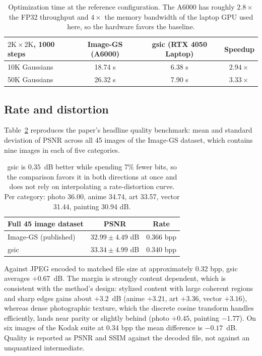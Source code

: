 \documentclass[11pt,a4paper]{article}
\begin{document}
\begin{table}[h]
\centering\small
\begin{tabular}{lccc}
\toprule
$2\mathrm{K}\times2\mathrm{K}$, 1000 steps & Image-GS (A6000) & gsic (RTX 4050 Laptop) & Speedup \\
\midrule
10K Gaussians & 18.74 s & 6.38 s & $2.94\times$ \\
50K Gaussians & 26.32 s & 7.90 s & $3.33\times$ \\
\bottomrule
\end{tabular}
\caption{Optimization time at the reference configuration. The A6000 has roughly $2.8\times$ the FP32 throughput and $4\times$ the memory bandwidth of the laptop GPU used here, so the hardware favors the baseline.}
\label{tab:speed}
\end{table}

\subsection{Rate and distortion}

Table~\ref{tab:quality} reproduces the paper's headline quality benchmark: mean and standard deviation of PSNR across all 45 images of the Image-GS dataset, which contains nine images in each of five categories.

\begin{table}[h]
\centering\small
\begin{tabular}{lcc}
\toprule
Full 45 image dataset & PSNR & Rate \\
\midrule
Image-GS (published) & $32.99 \pm 4.49$ dB & 0.366 bpp \\
gsic & $33.34 \pm 4.99$ dB & 0.340 bpp \\
\bottomrule
\end{tabular}
\caption{gsic is $0.35$~dB better while spending 7\% fewer bits, so the comparison favors it in both directions at once and does not rely on interpolating a rate-distortion curve. Per category: photo 36.00, anime 34.74, art 33.57, vector 31.44, painting 30.94 dB.}
\label{tab:quality}
\end{table}

Against JPEG encoded to matched file size at approximately 0.32 bpp, gsic averages $+0.67$~dB. The margin is strongly content dependent, which is consistent with the method's design: stylized content with large coherent regions and sharp edges gains about $+3.2$~dB (anime $+3.21$, art $+3.36$, vector $+3.16$), whereas dense photographic texture, which the discrete cosine transform handles efficiently, lands near parity or slightly behind (photo $+0.45$, painting $-1.77$). On six images of the Kodak suite \cite{kodak} at 0.34 bpp the mean difference is $-0.17$~dB. Quality is reported as PSNR and SSIM \cite{ssim} against the decoded file, not against an unquantized intermediate.
\end{document}
